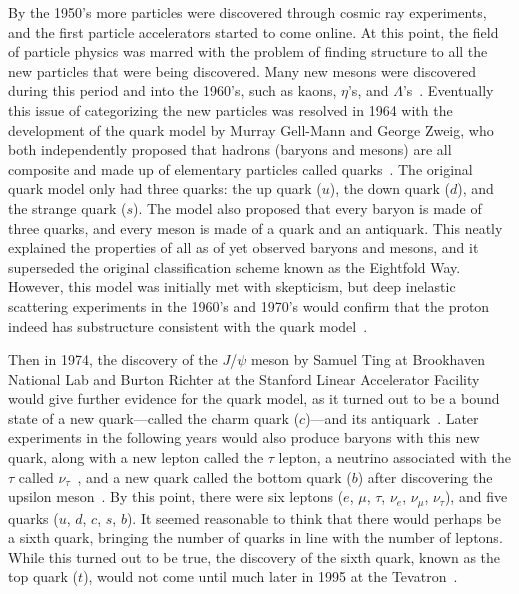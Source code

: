 By the 1950's more particles were discovered through cosmic ray experiments, and the first particle accelerators started to come online.
At this point, the field of particle physics was marred with the problem of finding structure to all the new particles that were being discovered.
Many new mesons were discovered during this period and into the 1960's, such as kaons, $\eta$'s, and $\Lambda$'s~\cite{CosmicRay,PhysRevLett.7.421}.
Eventually this issue of categorizing the new particles was resolved in 1964 with the development of the quark model by Murray Gell-Mann and George Zweig, who both independently proposed that hadrons (baryons and mesons) are all composite and made up of elementary particles called quarks~\cite{Gellmann1964214,Zweig:1981pd}.
The original quark model only had three quarks: the up quark ($u$), the down quark ($d$), and the strange quark ($s$).
The model also proposed that every baryon is made of three quarks, and every meson is made of a quark and an antiquark.
This neatly explained the properties of all as of yet observed baryons and mesons, and it superseded the original classification scheme known as the Eightfold Way.
However, this model was initially met with skepticism, but deep inelastic scattering experiments in the 1960's and 1970's would confirm that the proton indeed has substructure consistent with the quark model~\cite{PhysRevLett.23.930,cernQuarks}.

Then in 1974, the discovery of the $J$/$\psi$ meson by Samuel Ting at Brookhaven National Lab and Burton Richter at the Stanford Linear Accelerator Facility would give further evidence for the quark model, as it turned out to be a bound state of a new quark---called the charm quark ($c$)---and its antiquark~\cite{PhysRevLett.33.1406,PhysRevLett.33.1404}.
Later experiments in the following years would also produce baryons with this new quark, along with a new lepton called the $\tau$ lepton, a neutrino associated with the $\tau$ called $\nu_\tau$~\cite{Perl:1976rz}, and a new quark called the bottom quark ($b$) after discovering the upsilon meson~\cite{1977PhRvL..39..252H}.
By this point, there were six leptons ($e$, $\mu$, $\tau$, $\nu_e$, $\nu_\mu$, $\nu_\tau$), and five quarks ($u$, $d$, $c$, $s$, $b$).
It seemed reasonable to think that there would perhaps be a sixth quark, bringing the number of quarks in line with the number of leptons.
While this turned out to be true, the discovery of the sixth quark, known as the top quark ($t$), would not come until much later in 1995 at the Tevatron~\cite{PhysRevLett.74.2626}.

